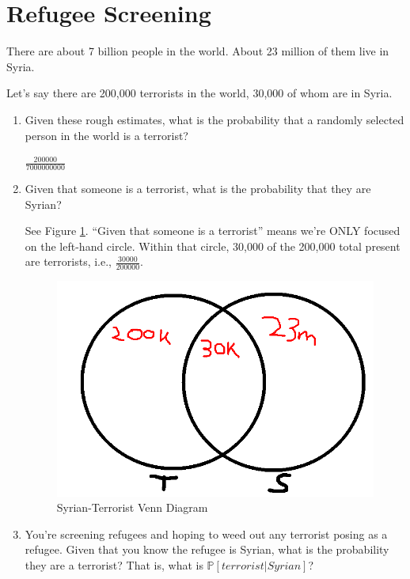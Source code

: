 \documentclass{article}
\newenvironment{solution}{\color{red}}{\color{black}}
\begin{document}
\begin{enumerate}
\begin{solution}
\end{solution}

\end{enumerate}

\section{Refugee Screening}

There are about 7 billion people in the world. About 23 million of them live in Syria.

Let's say there are 200,000 terrorists in the world, 30,000 of whom are in Syria.

\begin{enumerate}
\item Given these rough estimates, what is the probability that a randomly selected person in the world is a terrorist?

\begin{solution}
$\frac{200000}{7000000000}$
\end{solution}

\item Given that someone is a terrorist, what is the probability that they are Syrian?

\begin{solution}
See Figure \ref{fig:venn}. ``Given that someone is a terrorist'' means we're ONLY focused on the left-hand circle. Within that circle, 30,000 of the 200,000 total present are terrorists, i.e., $\frac{30000}{200000}$.

\begin{figure}[htbp]
\centering
\caption{Syrian-Terrorist Venn Diagram}
\label{fig:venn}
\includegraphics[width = .5\textwidth]{recitation160901_fig4.png}
\end{figure}
\end{solution}

\item You're screening refugees and hoping to weed out any terrorist posing as a refugee. Given that you know the refugee is Syrian, what is the probability they are a terrorist? That is, what is $\mathbb{P}[terrorist|Syrian]$?


\end{enumerate}
\end{document}
